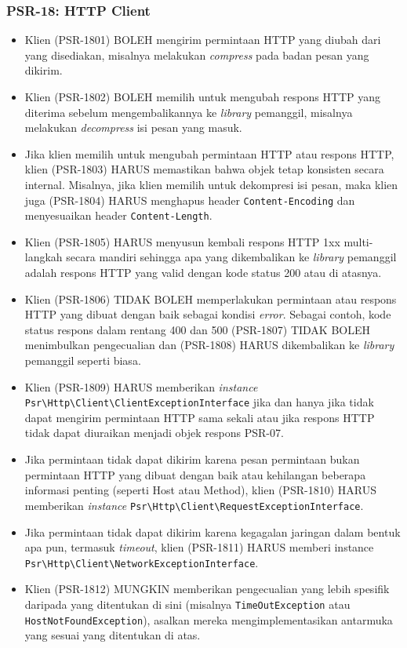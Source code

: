 \subsubsection{PSR-18: HTTP Client}
\label{subsubsec:psr18}
\begin{itemize}
	\item Klien (PSR-1801) BOLEH mengirim permintaan HTTP yang diubah dari yang disediakan, misalnya melakukan \textit{compress} pada badan pesan yang dikirim.
	\item Klien (PSR-1802) BOLEH memilih untuk mengubah respons HTTP yang diterima sebelum mengembalikannya ke \textit{library} pemanggil, misalnya melakukan \textit{decompress} isi pesan yang masuk. 
	\item Jika klien memilih untuk mengubah permintaan HTTP atau respons HTTP, klien (PSR-1803) HARUS memastikan bahwa objek tetap konsisten secara internal. Misalnya, jika klien memilih untuk dekompresi isi pesan, maka klien juga (PSR-1804) HARUS menghapus header \verb|Content-Encoding| dan menyesuaikan header \verb|Content-Length|.
	
	\item Klien (PSR-1805) HARUS menyusun kembali respons HTTP 1xx multi-langkah secara mandiri sehingga apa yang dikembalikan ke \textit{library} pemanggil adalah respons HTTP yang valid dengan kode status 200 atau di atasnya.
	
	\item Klien (PSR-1806) TIDAK BOLEH memperlakukan permintaan atau respons HTTP yang dibuat dengan baik sebagai kondisi \textit{error}. Sebagai contoh, kode status respons dalam rentang 400 dan 500 (PSR-1807) TIDAK BOLEH menimbulkan pengecualian dan (PSR-1808) HARUS dikembalikan ke \textit{library} pemanggil seperti biasa.
	\item Klien (PSR-1809) HARUS memberikan \textit{instance} \verb|Psr\Http\Client\ClientExceptionInterface| jika dan hanya jika tidak dapat mengirim permintaan HTTP sama sekali atau jika respons HTTP tidak dapat diuraikan menjadi objek respons PSR-07.
	\item Jika permintaan tidak dapat dikirim karena pesan permintaan bukan permintaan HTTP yang dibuat dengan baik atau kehilangan beberapa informasi penting (seperti Host atau Method), klien (PSR-1810) HARUS memberikan \textit{instance} \verb|Psr\Http\Client\RequestExceptionInterface|.
	\item Jika permintaan tidak dapat dikirim karena kegagalan jaringan dalam bentuk apa pun, termasuk \textit{timeout}, klien (PSR-1811) HARUS memberi instance \verb|Psr\Http\Client\NetworkExceptionInterface|.
	\item Klien (PSR-1812) MUNGKIN memberikan pengecualian yang lebih spesifik daripada yang ditentukan di sini (misalnya \verb|TimeOutException| atau \verb|HostNotFoundException|), asalkan mereka mengimplementasikan antarmuka yang sesuai yang ditentukan di atas.
\end{itemize}

